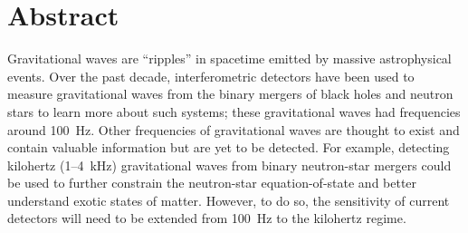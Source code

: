 \chapter*{Abstract}


Gravitational waves are ``ripples'' in spacetime emitted by massive astrophysical events. %
Over the past decade, interferometric detectors have been used to measure gravitational waves from the binary mergers of black holes and neutron stars to learn more about such systems; these gravitational waves had frequencies around 100~Hz.
Other frequencies of gravitational waves are thought to exist and contain valuable information but are yet to be detected. For example, detecting kilohertz (1--4~kHz) gravitational waves from binary neutron-star mergers could be used to further constrain the neutron-star equation-of-state and better understand exotic states of matter.
However, to do so, the sensitivity of current detectors will need to be extended from 100~Hz to the kilohertz regime. 

